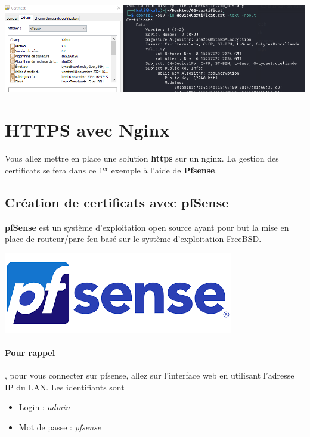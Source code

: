 \documentclass[french, 12pt]{article}%
\newcommand{\itemE}{\item[$\bullet$]}
\begin{document}
\begin{center}
\includegraphics[scale=0.5]{./ressource/exCertificat}
\end{center}



\section{HTTPS avec Nginx}
Vous allez mettre en place une solution \textbf{https} sur un nginx.  La gestion des certificats se fera dans ce 1$^\text{er}$ exemple à l'aide de \textbf{Pfsense}. 


\subsection{Création de certificats avec pfSense}

\begin{minipage}{0.6\linewidth}
\textbf{pfSense} est un système d'exploitation open source ayant pour but la mise en place de routeur/pare-feu basé sur le système d'exploitation FreeBSD. 

\end{minipage}
\begin{minipage}{0.36\linewidth}
\begin{center}
\includegraphics[scale=0.3]{./ressource/fpsenseLogo}
\end{center}
\end{minipage}

\paragraph{Pour rappel}, pour vous connecter sur pfsense, allez sur l'interface web en utilisant l'adresse IP du LAN. Les identifiants sont 
\begin{itemize}
\itemE Login : \textit{admin}
\itemE Mot de passe : \textit{pfsense} 
\end{itemize}
\end{document}
